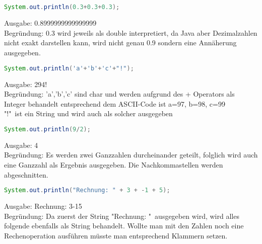 \documentclass{article}
\begin{document}
        \subsection{}
            \begin{lstlisting}[language=Java, autogobble]
            System.out.println(0.3+0.3+0.3);
            \end{lstlisting}
                Ausgabe: 0.8999999999999999\\
                Begründung: 0.3 wird jeweils als double interpretiert, da Java aber Dezimalzahlen
                    nicht exakt darstellen kann, wird nicht genau 0.9 sondern eine Annäherung ausgegeben.
            \begin{lstlisting}[language=Java, autogobble]
                System.out.println('a'+'b'+'c'+"!");
            \end{lstlisting}
                Ausgabe: 294!\\
                Begründung: 'a','b','c' sind char und werden aufgrund des + Operators als Integer behandelt
                            entsprechend dem ASCII-Code ist a=97, b=98, c=99\\
                            "!"\ ist ein String und wird auch als solcher ausgegeben
            \begin{lstlisting}[language=Java, autogobble]
                System.out.println(9/2);
            \end{lstlisting}
                Ausgabe: 4\\
                Begründung: Es werden zwei Ganzzahlen durcheinander geteilt, folglich wird auch eine
                            Ganzzahl als Ergebnis ausgegeben. Die Nachkommastellen werden abgeschnitten.
            \begin{lstlisting}[language=Java, autogobble]
                System.out.println("Rechnung: " + 3 + -1 + 5);
            \end{lstlisting}
                Ausgabe: Rechnung: 3-15\\
                Begründung: Da zuerst der String "Rechnung: "\ ausgegeben wird, wird alles folgende ebenfalls
                            als String behandelt. Wollte man mit den Zahlen noch eine Rechenoperation ausführen
                            müsste man entsprechend Klammern setzen.

        \subsection{}
            
\end{document}
